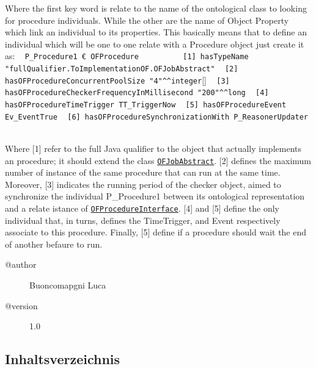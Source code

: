  Where the first key word is relate to the name of the ontological
 class to looking for procedure individuals. While the other are
 the name of Object Property which link an individual to its
 properties.  
 This basically means that to define an individual which will be 
 one to one relate with a Procedure object just create it as:
 {\ttfamily
\mbox{ }	\verb!P_Procedure1 € OFProcedure!\mbox{ }\mbox{ }\mbox{ }\mbox{ }\mbox{ }\mbox{ }\mbox{ }\mbox{ }\mbox{}\newline
\mbox{ }		\verb![1] hasTypeName "fullQualifier.ToImplementationOF.OFJobAbstract"!\mbox{}\newline
\mbox{ }		\verb![2] hasOFProcedureConcurrentPoolSize "4"^^integer![]\mbox{}\newline
\mbox{ }		\verb![3] hasOFProcedureCheckerFrequencyInMillisecond "200"^^long!\mbox{}\newline
\mbox{ }		\verb![4] hasOFProcedureTimeTrigger TT_TriggerNow!\mbox{}\newline
\mbox{ }		\verb![5] hasOFProcedureEvent Ev_EventTrue!\mbox{}\newline
\mbox{ }		\verb![6] hasOFProcedureSynchronizationWith P_ReasonerUpdater!	\mbox{ }\mbox{}\newline
\mbox{ }}

 Where [1] refer to the full Java qualifier to the object that
 actually implements an procedure; it should extend the class \texttt{\hyperlink{ontologyFramework.OFProcedureManagment.OFProcedureImplementation.OFJobAbstract-class}{OFJobAbstract}}.
 [2] defines the maximum number of instance of the same procedure that 
 can run at the same time. Moreover, [3] indicates the running period of the
 checker object, aimed to synchronize the individual P\_Procedure1 between its
 ontological representation and a relate istance of \texttt{\hyperlink{ontologyFramework.OFProcedureManagment.OFProcedureInterface-class}{OFProcedureInterface}}.
 [4] and [5] define the only individual that, in turns, defines the TimeTrigger,
 and Event respectively associate to this procedure. Finally, [5] define if
 a procedure should wait the end of another befaure to run.
\begin{description}
\item[@author] 
Buoncomapgni Luca
\item[@version] 
1.0
\end{description}
\subsection{Inhaltsverzeichnis}
